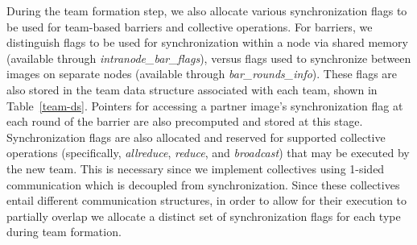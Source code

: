 During the team formation step, we also allocate various synchronization flags
to be used for team-based barriers and collective operations. For barriers, we
distinguish flags to be used for synchronization within a node via shared
memory (available through \textit{intranode\_bar\_flags}),
versus flags used to synchronize between images on separate nodes (available
through \textit{bar\_rounds\_info}). These flags are also stored in the team
data structure associated with each team, shown in Table~\ref{team-ds}.
Pointers for accessing a partner image's
synchronization flag at each round of the barrier are also precomputed and
stored at this stage.
Synchronization flags are also allocated and reserved for supported collective
operations (specifically, \textit{allreduce}, \textit{reduce}, and
\textit{broadcast}) that may be executed by the new team. This is necessary since we implement
collectives using 1-sided communication which is decoupled from
synchronization. Since these collectives entail different communication
structures, in order to allow for their execution to partially overlap we
allocate a distinct set of synchronization flags for each type during team
formation. %


%


